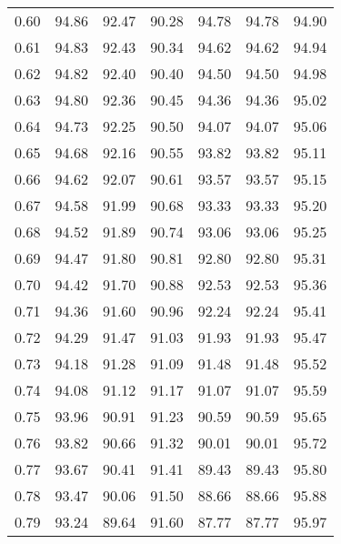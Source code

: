 \begin{tabular}{|c|c|c|c|c|c|c|}
      0.60 &     94.86 &     92.47 &      90.28 &   94.78 &      94.78 &         94.90 \\
      0.61 &     94.83 &     92.43 &      90.34 &   94.62 &      94.62 &         94.94 \\
      0.62 &     94.82 &     92.40 &      90.40 &   94.50 &      94.50 &         94.98 \\
      0.63 &     94.80 &     92.36 &      90.45 &   94.36 &      94.36 &         95.02 \\
      0.64 &     94.73 &     92.25 &      90.50 &   94.07 &      94.07 &         95.06 \\
      0.65 &     94.68 &     92.16 &      90.55 &   93.82 &      93.82 &         95.11 \\
      0.66 &     94.62 &     92.07 &      90.61 &   93.57 &      93.57 &         95.15 \\
      0.67 &     94.58 &     91.99 &      90.68 &   93.33 &      93.33 &         95.20 \\
      0.68 &     94.52 &     91.89 &      90.74 &   93.06 &      93.06 &         95.25 \\
      0.69 &     94.47 &     91.80 &      90.81 &   92.80 &      92.80 &         95.31 \\
      0.70 &     94.42 &     91.70 &      90.88 &   92.53 &      92.53 &         95.36 \\
      0.71 &     94.36 &     91.60 &      90.96 &   92.24 &      92.24 &         95.41 \\
      0.72 &     94.29 &     91.47 &      91.03 &   91.93 &      91.93 &         95.47 \\
      0.73 &     94.18 &     91.28 &      91.09 &   91.48 &      91.48 &         95.52 \\
      0.74 &     94.08 &     91.12 &      91.17 &   91.07 &      91.07 &         95.59 \\
      0.75 &     93.96 &     90.91 &      91.23 &   90.59 &      90.59 &         95.65 \\
      0.76 &     93.82 &     90.66 &      91.32 &   90.01 &      90.01 &         95.72 \\
      0.77 &     93.67 &     90.41 &      91.41 &   89.43 &      89.43 &         95.80 \\
      0.78 &     93.47 &     90.06 &      91.50 &   88.66 &      88.66 &         95.88 \\
      0.79 &     93.24 &     89.64 &      91.60 &   87.77 &      87.77 &         95.97 \\

\end{tabular}

